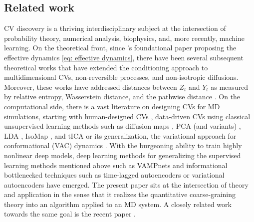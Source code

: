 \documentclass[reqno, 12pt]{article}
\begin{document}
\subsection{Related work} CV discovery is a thriving interdisciplinary subject at the intersection of probability theory, numerical analysis, biophysics, and, more recently, machine learning. On the theoretical front, since \citeauthor{legoll2010effective}'s foundational paper proposing the effective dynamics \eqref{eq: effective dynamics}, there have been several subsequent theoretical works that have extended the conditioning approach to multidimensional CVs, non-reversible processes, and non-isotropic diffusions. Moreover, these works have addressed distances between $Z_t$ and $Y_t$ as measured by relative entropy, Wasserstein distance, and the pathwise distance \parencite{duong2018quantification, Lelièvre2019, hartmann2020coarse, hartmann2020coarse, legoll2019effective}. On the computational side, there is a vast literature on designing CVs for MD simulations, starting with human-designed CVs \cite{heilmann2020sampling, ooka2023accurate, chodera2007automatic, hinsen2020hydrogen, altis2008dihedral, schwantes2013improvements}, data-driven CVs using classical unsupervised learning methods such as diffusion maps \cite{rohrdanz2011determination, zheng2013rapid, preto2014fast}, PCA (and variants) \cite{romero2007essential, grossfield2007application}, LDA \cite{sasmal2023reaction}, IsoMap \cite{spiwok2011metadynamics, zheng2013molecular}, and tICA \cite{m2017tica, schwantes2015modeling, schultze2021time} or its generalization, the variational approach for conformational (VAC) dynamics \cite{perez2013identification, noe2013variational, nuske2014variational}. With the burgeoning ability to train highly nonlinear deep models, deep learning methods for generalizing the supervised learning methods mentioned above such as VAMPnets \cite{chen2019selecting, mardt2018vampnets, bonati2021deep} and informational bottlenecked techniques such as time-lagged autoencoders \cite{wehmeyer2018time, zhang2023understanding, chen2018molecular} or variational autoencoders \cite{wang2021state, wang2024information, ribeiro2018reweighted, hernandez2018variational} have emerged. The present paper sits at the intersection of theory and application in the sense that it realizes the quantitative coarse-graining theory into an algorithm applied to an MD system. A closely related work towards the same goal is the recent paper \cite{zhang2024finding}.
\end{document}
